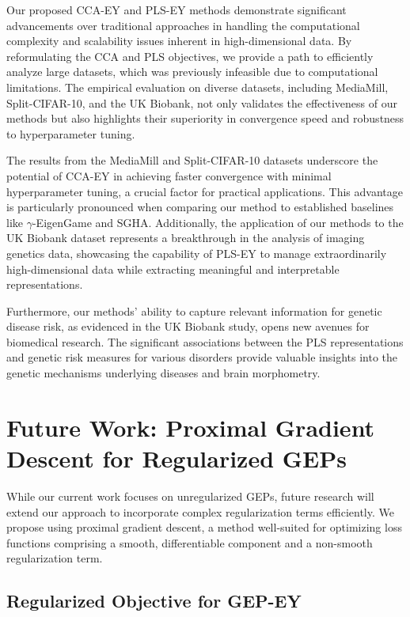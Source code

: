 Our proposed CCA-EY and PLS-EY methods demonstrate significant advancements over traditional approaches in handling the computational complexity and scalability issues inherent in high-dimensional data.
By reformulating the CCA and PLS objectives, we provide a path to efficiently analyze large datasets, which was previously infeasible due to computational limitations.
The empirical evaluation on diverse datasets, including MediaMill, Split-CIFAR-10, and the UK Biobank, not only validates the effectiveness of our methods but also highlights their superiority in convergence speed and robustness to hyperparameter tuning.

The results from the MediaMill and Split-CIFAR-10 datasets underscore the potential of CCA-EY in achieving faster convergence with minimal hyperparameter tuning, a crucial factor for practical applications.
This advantage is particularly pronounced when comparing our method to established baselines like $\gamma$-EigenGame and SGHA. Additionally, the application of our methods to the UK Biobank dataset represents a breakthrough in the analysis of imaging genetics data, showcasing the capability of PLS-EY to manage extraordinarily high-dimensional data while extracting meaningful and interpretable representations.

Furthermore, our methods' ability to capture relevant information for genetic disease risk, as evidenced in the UK Biobank study, opens new avenues for biomedical research.
The significant associations between the PLS representations and genetic risk measures for various disorders provide valuable insights into the genetic mechanisms underlying diseases and brain morphometry.

\section{Future Work: Proximal Gradient Descent for Regularized GEPs}

While our current work focuses on unregularized GEPs, future research will extend our approach to incorporate complex regularization terms efficiently. We propose using proximal gradient descent, a method well-suited for optimizing loss functions comprising a smooth, differentiable component and a non-smooth regularization term.

\subsection{Regularized Objective for GEP-EY}

